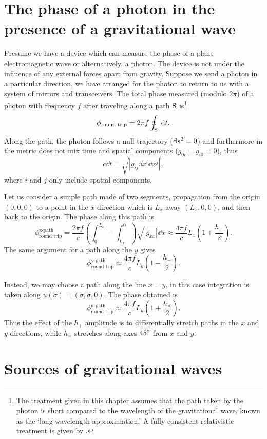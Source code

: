 \section{The phase of a photon in the presence of a gravitational wave}
Presume we have a device which can measure the phase of a plane electromagnetic wave or alternatively, a photon. %
The device is not under the influence of any external forces apart from gravity. %
Suppose we send a photon in a particular direction, we have arranged for the photon to return to us with a system of mirrors and transceivers. %
The total phase measured (modulo $2\pi$) of a photon with frequency $f$ after traveling along a path $\rm S$ is\footnote{The treatment given in this chapter assumes that the path taken by the photon is short compared to the wavelength of the gravitational wave, known as the `long wavelength approximation.' A fully consistent relativistic treatment is given by \citet{RakhmanovPhoton}.}
\begin{equation}
\phi_{\text{round trip}} = 2\pi f\oint_{\rm S} \; \mathrm{d} t.
\end{equation}
Along the path, the photon follows a null trajectory ($\mathrm{d} s^2=0$) and furthermore in  the metric does not mix time and spatial components ($g_{0i}=g_{i0}=0$), thus
\begin{equation}
c\dd t = \sqrt{|g_{ij}\dd x^i \dd x^j|},
\end{equation}
where $i$ and $j$ only include spatial components.

Let us consider a simple path made of two segments, propagation from the origin $(0,0,0)$ to a point in the $x$ direction which is $L_x$ away $(L_x,0,0)$, and then back to the origin. %
The phase along this path is
\begin{equation}
\phi_{\text{round trip}}^{\text{x-path}}= \frac{2\pi f}{c} \left(\int_0^{L_x}-\int^0_{L_x}\right)\sqrt{|g_{xx}|}\dd x \approx \frac{4\pi f}{c} L_x \left(1+\frac{h_+}{2}\right).
\end{equation} 
The same argument for a path along the $y$ gives
\begin{equation}
\phi_{\text{round trip}}^{\text{y-path}} \approx \frac{4\pi f}{c} L_y \left(1-\frac{h_+}{2}\right).
\end{equation} 

Instead, we may choose a path along the line $x=y$, in this case integration is taken along $ u(\sigma) = (\sigma,\sigma,0)$. %
The phase obtained is
\begin{equation}
\phi_{\text{round trip}}^{\text{u-path}} \approx \frac{4\pi f}{c} L_u \left(1+\frac{h_\times}{2}\right).
\end{equation} 
Thus the effect of the $h_+$ amplitude is to differentially stretch paths in the $x$ and $y$ directions, while $h_\times$ stretches along axes $45 ^\circ$ from $x$ and $y$. %

\section{Sources of gravitational waves}


